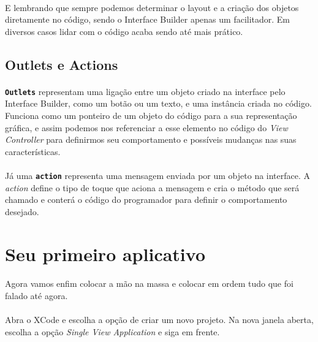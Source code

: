 \documentclass[a4paper,12pt,brazil,doubleside]{book}
\begin{document}
\paragraph{}E lembrando que sempre podemos determinar o layout e a criação dos objetos diretamente no código, sendo o Interface Builder apenas um facilitador. Em diversos casos lidar com o código acaba sendo até mais prático.

\bigskip

\subsection{Outlets e Actions}

\paragraph{}\texttt{\textbf{Outlets}} representam uma ligação entre um objeto criado na interface pelo Interface Builder, como um botão ou um texto, e uma instância criada no código. Funciona como um ponteiro de um objeto do código para a sua representação gráfica, e assim podemos nos referenciar a esse elemento no código do \emph{View Controller} para definirmos seu comportamento e possíveis mudanças nas suas características.
\paragraph{}Já uma \texttt{\textbf{action}} representa uma mensagem enviada por um objeto na interface. A \emph{action} define o tipo de toque que aciona a mensagem e cria o método que será chamado e conterá o código do programador para definir o comportamento desejado.

\bigskip
\bigskip


\section{Seu primeiro aplicativo}

\paragraph{}Agora vamos enfim colocar a mão na massa e colocar em ordem tudo que foi falado até agora.
\paragraph{}Abra o XCode e escolha a opção de criar um novo projeto. Na nova janela aberta, escolha a opção \emph{Single View Application} e siga em frente.
\end{document}
